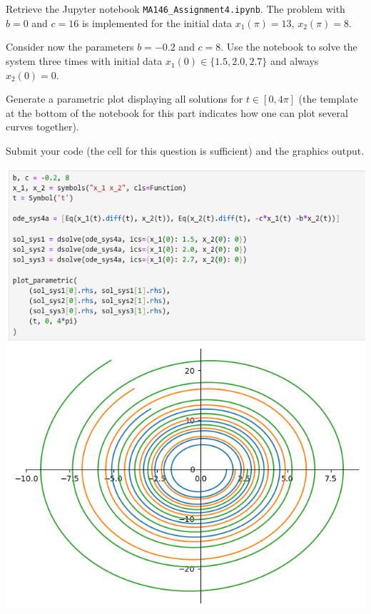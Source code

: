 \documentclass[a4paper]{article}
\begin{document}
\subsection{~} %

\begin{questionbody}
Retrieve the Jupyter notebook \texttt{MA146\_Assignment4.ipynb}. The problem with $b = 0$ and $c = 16$ is implemented for the initial data $x_1(\pi) = 13$, $x_2(\pi) = 8$.

Consider now the parameters $b = −0.2$ and $c = 8$. Use the notebook to solve the system three times with initial data $x_1(0) \in \{1.5, 2.0, 2.7\}$ and always $x_2(0) = 0$.

Generate a parametric plot displaying all solutions for $t \in [0, 4\pi]$ (the template at the bottom of the notebook for this part indicates how one can plot several curves together).

Submit your code (the cell for this question is sufficient) and the graphics output.
\end{questionbody}

\includegraphics[width=\linewidth]{Q4}
\end{document}
